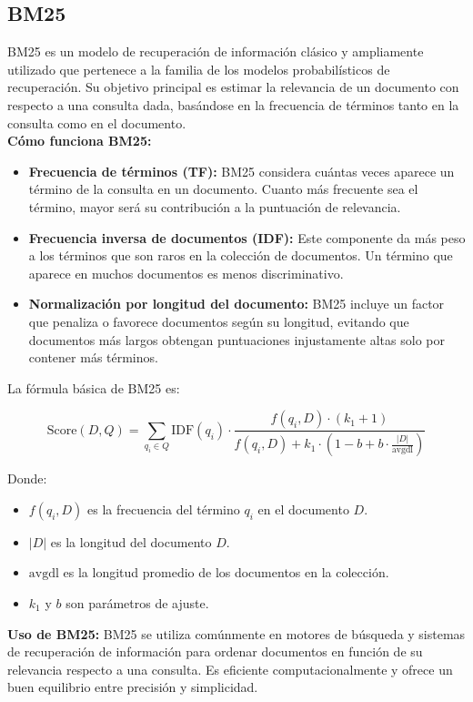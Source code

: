 \documentclass[runningheads]{llncs}
\begin{document}
\subsection*{BM25}

BM25 es un modelo de recuperación de información clásico y ampliamente utilizado que pertenece a la familia de los modelos probabilísticos de recuperación. Su objetivo principal es estimar la relevancia de un documento con respecto a una consulta dada, basándose en la frecuencia de términos tanto en la consulta como en el documento. \\

\textbf{Cómo funciona BM25:}
\begin{itemize}
    \item \textbf{Frecuencia de términos (TF):} BM25 considera cuántas veces aparece un término de la consulta en un documento. Cuanto más frecuente sea el término, mayor será su contribución a la puntuación de relevancia.
    \item \textbf{Frecuencia inversa de documentos (IDF):} Este componente da más peso a los términos que son raros en la colección de documentos. Un término que aparece en muchos documentos es menos discriminativo.
    \item \textbf{Normalización por longitud del documento:} BM25 incluye un factor que penaliza o favorece documentos según su longitud, evitando que documentos más largos obtengan puntuaciones injustamente altas solo por contener más términos.
\end{itemize}


La fórmula básica de BM25 es:

\[
\text{Score}(D, Q) = \sum_{q_i \in Q} \text{IDF}(q_i) \cdot \frac{f(q_i, D) \cdot (k_1 + 1)}{f(q_i, D) + k_1 \cdot (1 - b + b \cdot \frac{|D|}{\text{avgdl}})}
\]\cite{okapibm25}

Donde:
\begin{itemize}
    \item $f(q_i, D)$ es la frecuencia del término $q_i$ en el documento $D$.
    \item $|D|$ es la longitud del documento $D$.
    \item $\text{avgdl}$ es la longitud promedio de los documentos en la colección.
    \item $k_1$ y $b$ son parámetros de ajuste.
\end{itemize}

\textbf{Uso de BM25:}
BM25 se utiliza comúnmente en motores de búsqueda y sistemas de recuperación de información para ordenar documentos en función de su relevancia respecto a una consulta. Es eficiente computacionalmente y ofrece un buen equilibrio entre precisión y simplicidad.
\end{document}
